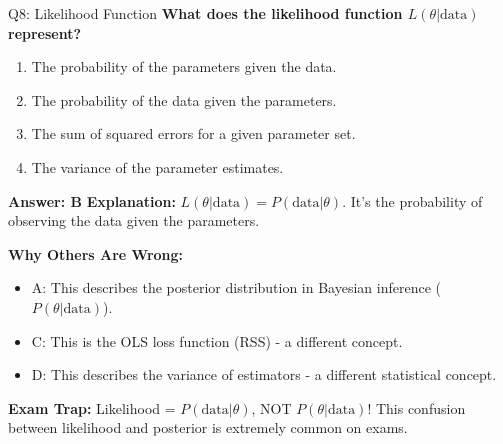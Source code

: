 \documentclass[8pt]{beamer}
\begin{document}
	\begin{frame}{Q8: Likelihood Function}
		\fontsize{6.5}{7.5}\selectfont
		\textbf{What does the likelihood function $L(\theta | \text{data})$ represent?}
		
		\begin{enumerate}
			\item The probability of the parameters given the data.
			\item The probability of the data given the parameters.
			\item The sum of squared errors for a given parameter set.
			\item The variance of the parameter estimates.
		\end{enumerate}
		
		\vspace{0.05cm}
		\textcolor{myblue}{\textbf{Answer: B}}
		\vspace{0.05cm}
		\textcolor{myblue}{\textbf{Explanation:}} $L(\theta | \text{data}) = P(\text{data} | \theta)$. It's the probability of observing the data given the parameters.
		
		\vspace{0.05cm}
		\textcolor{myred}{\textbf{Why Others Are Wrong:}}
		\begin{itemize}
			\item \textcolor{myred}{A:} This describes the posterior distribution in Bayesian inference ($P(\theta|\text{data})$).
			\item \textcolor{myred}{C:} This is the OLS loss function (RSS) - a different concept.
			\item \textcolor{myred}{D:} This describes the variance of estimators - a different statistical concept.
		\end{itemize}
		
		\textcolor{myred}{\textbf{Exam Trap:}} Likelihood = $P(\text{data} | \theta)$, NOT $P(\theta | \text{data})$! This confusion between likelihood and posterior is extremely common on exams.
	\end{frame}
	
\end{document}
